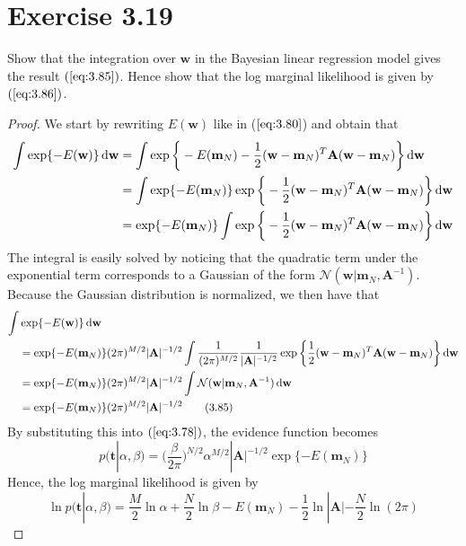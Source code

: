 \section*{Exercise 3.19}
Show that the integration over $\mathbf{w}$ in the Bayesian 
linear regression model gives the result $(\ref{eq:3.85})$.
Hence show that the log marginal likelihood is given by 
$(\ref{eq:3.86})$.

\vspace{1em}

\begin{proof}
    We start by rewriting $E(\mathbf{w})$ like in ($\ref{eq:3.80}$) and obtain that
    \begin{align*}
        \int \exp\{-E(\mathbf{w})\} \mathop{}\!\mathrm{d} \mathbf{w}
        &= \int \exp\bigg\{-E(\mathbf{m}_N) -
            \frac{1}{2} (\mathbf{w} - \mathbf{m}_N)^T\mathbf{A}(\mathbf{w} - \mathbf{m}_N)
            \bigg\}\mathop{}\!\mathrm{d} \mathbf{w} \\
        &= \int \exp\{-E(\mathbf{m}_N)\}
            \exp\bigg\{-\frac{1}{2} (\mathbf{w} - \mathbf{m}_N)^T\mathbf{A}(\mathbf{w} - \mathbf{m}_N)
            \bigg\}\mathop{}\!\mathrm{d} \mathbf{w} \\
        &= \exp\{-E(\mathbf{m}_N)\}  
            \int \exp\bigg\{-\frac{1}{2} (\mathbf{w} - \mathbf{m}_N)^T\mathbf{A}(\mathbf{w} - \mathbf{m}_N)
            \bigg\}\mathop{}\!\mathrm{d} \mathbf{w}
    \end{align*}
    The integral is easily solved by noticing that the quadratic 
    term under the exponential term corresponds to a Gaussian of
    the form $\mathcal{N}(\mathbf{w} | \mathbf{m}_N, \mathbf{A}^{-1})$.
    Because the Gaussian distribution is normalized, we then have that
    \begin{align*}
        \int &\exp\{-E(\mathbf{w})\} \mathop{}\!\mathrm{d} \mathbf{w} \\
        &= \exp\{-E(\mathbf{m}_N)\} (2\pi)^{M / 2} |\mathbf{A}|^{-1/2}
            \int\frac{1}{(2\pi)^{M/2}}\frac{1}{|\mathbf{A}|^{-1/2}}
            \exp\bigg\{\frac{1}{2}
                (\mathbf{w} - \mathbf{m}_N)^T\mathbf{A}(\mathbf{w} - \mathbf{m}_N)
            \bigg\}\mathop{}\!\mathrm{d} \mathbf{w} \\
        &= \exp\{-E(\mathbf{m}_N)\} (2\pi)^{M / 2} |\mathbf{A}|^{-1/2}
            \int \mathcal{N}(\mathbf{w} | \mathbf{m}_N, \mathbf{A}^{-1}) \mathop{}\!\mathrm{d} \mathbf{w} \\
        &= \exp\{-E(\mathbf{m}_N)\} (2\pi)^{M / 2} |\mathbf{A}|^{-1/2} \label{eq:3.85}\tag{3.85}
    \end{align*}
    By substituting this into $(\ref{eq:3.78})$, the evidence function becomes
    \[
        p(\mathbf{t} | \alpha, \beta) 
        = \bigg(\frac{\beta}{2\pi}\bigg)^{N / 2} \alpha^{M/2} |\mathbf{A}|^{-1/2}
            \exp\{-E(\mathbf{m}_N)\}
    \] 
    Hence, the log marginal likelihood is given by
    \begin{equation}\label{eq:3.86}\tag{3.86}
        \ln p(\mathbf{t} | \alpha, \beta)
        = \frac{M}{2} \ln \alpha + \frac{N}{2} \ln \beta - E(\mathbf{m}_N)
            -\frac{1}{2} \ln|\mathbf{A}| - \frac{N}{2} \ln(2\pi)
    \end{equation}
\end{proof}

